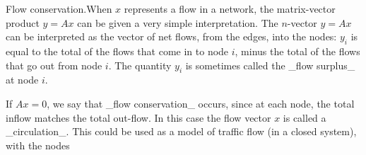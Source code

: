 Flow conservation.When \(x\) represents a flow in a network, the matrix-vector product \(y=Ax\) can be given a very simple interpretation. The \(n\)-vector \(y=Ax\) can be interpreted as the vector of net flows, from the edges, into the nodes: \(y_{i}\) is equal to the total of the flows that come in to node \(i\), minus the total of the flows that go out from node \(i\). The quantity \(y_{i}\) is sometimes called the _flow surplus_ at node \(i\).

If \(Ax=0\), we say that _flow conservation_ occurs, since at each node, the total inflow matches the total out-flow. In this case the flow vector \(x\) is called a _circulation_. This could be used as a model of traffic flow (in a closed system), with the nodes 